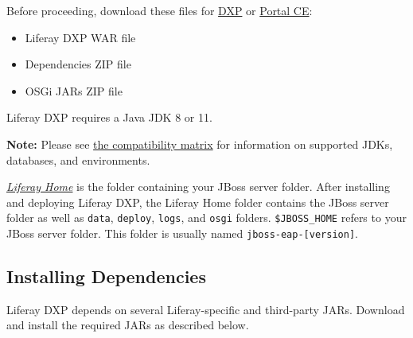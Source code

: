 Before proceeding, download these files for
\href{https://help.liferay.com/hc}{DXP} or
\href{https://www.liferay.com/downloads-community}{Portal CE}:

\begin{itemize}
\tightlist
\item
  Liferay DXP WAR file
\item
  Dependencies ZIP file
\item
  OSGi JARs ZIP file
\end{itemize}

Liferay DXP requires a Java JDK 8 or 11.

\noindent\hrulefill

\textbf{Note:} Please see
\href{https://www.liferay.com/documents/10182/246659966/Liferay+DXP+7.1+Compatibility+Matrix.pdf/c8805b72-c693-1f26-3f2d-731ffc301366}{the
compatibility matrix} for information on supported JDKs, databases, and
environments.

\noindent\hrulefill

\href{/docs/7-1/deploy/-/knowledge_base/d/installing-liferay\#liferay-home}{\emph{Liferay
Home}} is the folder containing your JBoss server folder. After
installing and deploying Liferay DXP, the Liferay Home folder contains
the JBoss server folder as well as \texttt{data}, \texttt{deploy},
\texttt{logs}, and \texttt{osgi} folders. \texttt{\$JBOSS\_HOME} refers
to your JBoss server folder. This folder is usually named
\texttt{jboss-eap-{[}version{]}}.

\subsection{Installing Dependencies}\label{installing-dependencies-2}

Liferay DXP depends on several Liferay-specific and third-party JARs.
Download and install the required JARs as described below.


